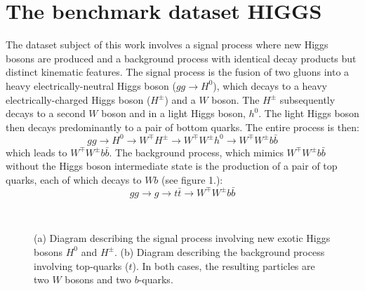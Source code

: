 \section{The benchmark dataset HIGGS}\label{data}%
The dataset subject of this work involves a signal process where new Higgs
bosons are produced and a background process with identical decay products
but distinct kinematic features.
The signal process is the fusion of two gluons into a heavy
electrically-neutral Higgs boson ($gg \rightarrow H^0$), which decays
to a heavy electrically-charged Higgs boson ($H^\pm$) and a $W$ boson.
The $H^\pm$ subsequently decays to a second $W$ boson and in a light Higgs
boson, $h^0$. The light Higgs boson then decays predominantly to a pair of
bottom quarks. The entire process is then:
\begin{equation}
 gg \rightarrow H^0 \rightarrow W^\mp H^\pm \rightarrow W^\mp W^\pm h^0
 \rightarrow W^\mp W^\pm b \bar{b}
\end{equation}
which leads to $W^\mp W^\pm b \bar{b}$. The background process, which
mimics $W^\mp W^\pm b \bar{b}$ without the Higgs boson intermediate state
is the production of a pair of top quarks, each of which decays to $Wb$
(see figure 1.):
\begin{equation}
 gg \rightarrow g \rightarrow t\bar{t} \rightarrow W^\mp W^\pm b \bar{b}
\end{equation}

\begin{figure}[htpb]
 \centering
  \quad
  \\
 \caption{(a) Diagram describing the signal process involving new exotic
  Higgs bosons $H^0$ and $H^\pm$. (b) Diagram describing the background
  process involving top-quarks ($t$). In both cases, the resulting
  particles are two $W$ bosons and two $b$-quarks.}
 \label{graphs}
\end{figure}

